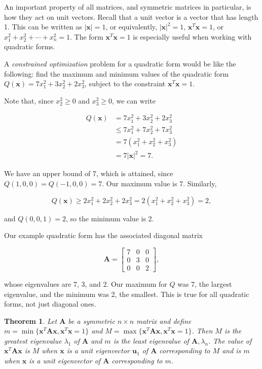 \documentclass[
]{book}
\newtheorem{theorem}{Theorem}[chapter]
\theoremstyle{definition}
\theoremstyle{definition}
\theoremstyle{definition}
\theoremstyle{definition}
\theoremstyle{remark}
\begin{document}
An important property of all matrices, and symmetric matrices in particular, is how they act on unit vectors. Recall that a unit vector is a vector that has length 1. This can be written as \(|\mathbf{x}|=1\), or equivalently, \(|\mathbf{x}|^2=1\), \(\mathbf{x}^T\mathbf{x}=1\), or \(x_1^2+x_2^2+\cdots+x_n^2=1\). The form \(\mathbf{x}^T\mathbf{x}=1\) is especially useful when working with quadratic forms.

A \emph{constrained optimization} problem for a quadratic form would be like the following: find the maximum and minimum values of the quadratic form \(Q(\mathbf{x})=7x_1^2+3x_2^2+2x_3^2\), subject to the constraint \(\mathbf{x}^T\mathbf{x}=1\).

Note that, since \(x_2^2\geq 0\) and \(x_3^2\geq 0\), we can write

\begin{align*} 
Q(\mathbf{x})&=7x_1^2+3x_2^2+2x_3^2\\
&\leq 7x_1^2+7x_2^2+7x_3^2\\
&=7(x_1^2+x_2^2+x_3^2)\\
&=7|\mathbf{x}|^2=7.
\end{align*}

We have an upper bound of 7, which is attained, since \(Q(1,0,0)=Q(-1,0,0)=7\). Our maximum value is 7. Similarly,

\[Q(\mathbf{x})\geq 2x_1^2+2x_2^2+2x_3^2=2(x_1^2+x_2^2+x_3^2)=2,\]

and \(Q(0,0,1)=2\), so the minimum value is 2.

Our example quadratic form has the associated diagonal matrix

\[\mathbf{A}=\begin{bmatrix}7 & 0 & 0\\0 & 3 & 0\\0 & 0 & 2\end{bmatrix},\]

whose eigenvalues are 7, 3, and 2. Our maximum for \(Q\) was 7, the largest eigenvalue, and the minimum was 2, the smallest. This is true for all quadratic forms, not just diagonal ones\autocite{LLM}.

\begin{theorembox}

\begin{theorem}
Let \(\mathbf{A}\) be a symmetric \(n\times n\) matrix and define \(m=\min\{\mathbf{x}^T\mathbf{A}\mathbf{x},\mathbf{x}^T\mathbf{x}=1\}\) and \(M=\max\{\mathbf{x}^T\mathbf{A}\mathbf{x},\mathbf{x}^T\mathbf{x}=1\}\). Then \(M\) is the greatest eigenvalue \(\lambda_1\) of \(\mathbf{A}\) and \(m\) is the least eigenvalue of \(\mathbf{A}, \lambda_n.\) The value of \(\mathbf{x}^T\mathbf{A}\mathbf{x}\) is \(M\) when \(\mathbf{x}\) is a unit eigenvector \(\mathbf{u}_1\) of \(\mathbf{A}\) corresponding to \(M\) and is \(m\) when \(\mathbf{x}\) is a unit eigenvector of \(\mathbf{A}\) corresponding to \(m\).
\end{theorem}

\end{theorembox}
\end{document}
